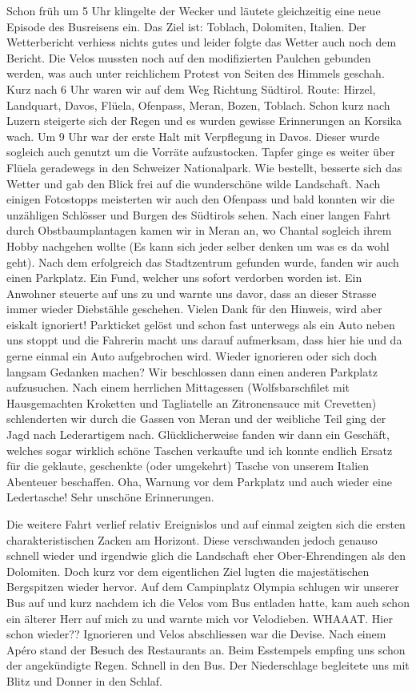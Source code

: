 Schon früh um 5 Uhr klingelte der Wecker und läutete gleichzeitig eine neue Episode des Busreisens ein.
Das Ziel ist: Toblach, Dolomiten, Italien.
Der Wetterbericht verhiess nichts gutes und leider folgte das Wetter auch noch dem Bericht.
Die Velos mussten noch auf den modifizierten Paulchen gebunden werden, was auch unter reichlichem Protest von Seiten des Himmels geschah.
Kurz nach 6 Uhr waren wir auf dem Weg Richtung Südtirol.
Route: Hirzel, Landquart, Davos, Flüela, Ofenpass, Meran, Bozen, Toblach.
Schon kurz nach Luzern steigerte sich der Regen und es wurden gewisse Erinnerungen an Korsika wach.
Um 9 Uhr war der erste Halt mit Verpflegung in Davos.
Dieser wurde sogleich auch genutzt um die Vorräte aufzustocken.
Tapfer ginge es weiter über Flüela geradewegs in den Schweizer Nationalpark.
Wie bestellt, besserte sich das Wetter und gab den Blick frei auf die wunderschöne wilde Landschaft.
Nach einigen Fotostopps meisterten wir auch den Ofenpass und bald konnten wir die unzähligen Schlösser und Burgen des Südtirols sehen.
Nach einer langen Fahrt durch Obstbaumplantagen kamen wir in Meran an, wo Chantal sogleich ihrem Hobby nachgehen wollte (Es kann sich jeder selber denken um was es da wohl geht).
Nach dem erfolgreich das Stadtzentrum gefunden wurde, fanden wir auch einen Parkplatz.
Ein Fund, welcher uns sofort verdorben worden ist.
Ein Anwohner steuerte auf uns zu und warnte uns davor, dass an dieser Strasse immer wieder Diebstähle geschehen.
Vielen Dank für den Hinweis, wird aber eiskalt ignoriert!  Parkticket gelöst und schon fast unterwegs als ein Auto neben uns stoppt und die Fahrerin macht uns darauf aufmerksam, dass hier hie und da gerne einmal ein Auto aufgebrochen wird.
Wieder ignorieren oder sich doch langsam Gedanken machen? Wir beschlossen dann einen anderen Parkplatz aufzusuchen.
Nach einem herrlichen Mittagessen (Wolfsbarschfilet mit Hausgemachten Kroketten und Tagliatelle an Zitronensauce mit Crevetten) schlenderten wir durch die Gassen von Meran und der weibliche Teil ging der Jagd nach Lederartigem nach.
Glücklicherweise fanden wir dann ein Geschäft, welches sogar wirklich schöne Taschen verkaufte und ich konnte endlich Ersatz für die geklaute, geschenkte (oder umgekehrt) Tasche von unserem Italien Abenteuer beschaffen.
Oha, Warnung vor dem Parkplatz und auch wieder eine Ledertasche! Sehr unschöne Erinnerungen.

Die weitere Fahrt verlief relativ Ereignislos und auf einmal zeigten sich die ersten charakteristischen Zacken am Horizont.
Diese verschwanden jedoch genauso schnell wieder und irgendwie glich die Landschaft eher Ober-Ehrendingen als den Dolomiten.
Doch kurz vor dem eigentlichen Ziel lugten die majestätischen Bergspitzen wieder hervor.
Auf dem Campinplatz Olympia schlugen wir unserer Bus auf und kurz nachdem ich die Velos vom Bus entladen hatte, kam auch schon ein älterer Herr auf mich zu und warnte mich vor Velodieben.
WHAAAT.
Hier schon wieder??  Ignorieren und Velos abschliessen war die Devise.
Nach einem Apéro stand der Besuch des Restaurants an.
Beim Esstempels empfing uns schon der angekündigte Regen.
Schnell in den Bus.
Der Niederschlage begleitete uns mit Blitz und Donner in den Schlaf.

